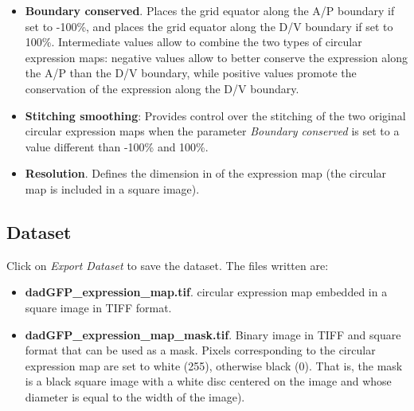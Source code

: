 \begin{itemize}
 \item \textbf{Boundary conserved}. Places the grid equator along the A/P boundary if set to -100\%, and places the grid equator along the D/V boundary if set to 100\%. Intermediate values allow to combine the two types of circular expression maps: negative values allow to better conserve the expression along the A/P than the D/V boundary, while positive values promote the conservation of the expression along the D/V boundary.
 \item \textbf{Stitching smoothing}: Provides control over the stitching of the two original circular expression maps when the parameter \textit{Boundary conserved} is set to a value different than -100\% and 100\%.
 \item \textbf{Resolution}. Defines the dimension in \px of the expression map (the circular map is included in a square image).
\end{itemize}

\subsection{Dataset}\label{sec:expression_maps_dataset}
Click on \textit{Export Dataset} to save the dataset. The files written are:

\begin{itemize}
 \item \textbf{dadGFP\_expression\_map.tif}. circular expression map embedded in a square image in TIFF format.
 \item \textbf{dadGFP\_expression\_map\_mask.tif}. Binary image in TIFF and square format that can be used as a mask. Pixels corresponding to the circular expression map are set to white (255), otherwise black (0). That is, the mask is a black square image with a white disc centered on the image and whose diameter is equal to the width of the image).
\end{itemize}

